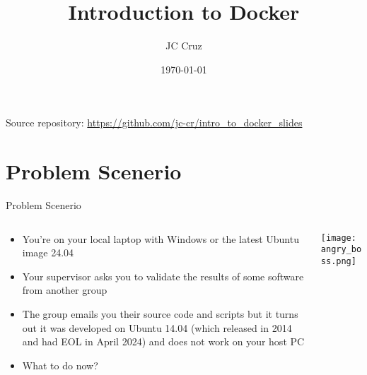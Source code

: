 \documentclass{beamer}
\title{Introduction to Docker}
\author{JC Cruz}
\date{\today}
\begin{document}
\begin{frame}[plain]
    \titlepage
    
    \vfill
    \begin{center}
        \small{Source repository: \href{https://github.com/jc-cr/intro_to_docker_slides}{https:\slash\slash github.com\slash jc-cr\slash intro\_to\_docker\_slides}}
    \end{center}
\end{frame}

\section{Problem Scenerio}

\begin{frame}{Problem Scenerio}
    \vspace{-20pt}
    \begin{columns}[T]
        \begin{column}{0.6\textwidth}
            \begin{itemize}
                \item You're on your local laptop with Windows or the latest Ubuntu image 24.04
                \item Your supervisor asks you to validate the results of some software from another group
                \item The group emails you their source code and scripts but it turns out it was developed on Ubuntu 14.04 (which released in 2014 and had EOL in April 2024) and does not work on your host PC
                \item What to do now?
            \end{itemize}
        \end{column}
        \begin{column}{0.4\textwidth}
            \texttt{[image: angry\_boss.png]}
        \end{column}
    \end{columns}
\end{frame}
\end{document}
